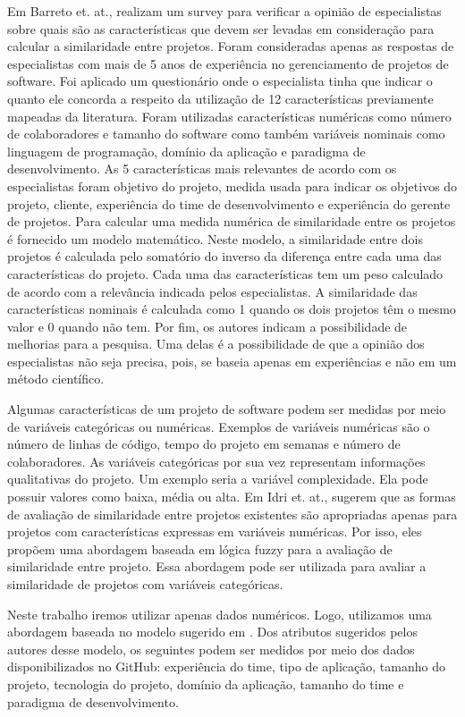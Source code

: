 Em \cite{barreto2010analyzing} Barreto et. at., realizam um survey para verificar a opinião de especialistas sobre quais são as características que devem ser levadas em consideração para calcular a similaridade entre projetos.  Foram consideradas apenas as respostas de especialistas com mais de 5 anos de experiência no gerenciamento de projetos de software.  Foi aplicado um questionário onde o especialista tinha que indicar o quanto ele concorda a respeito da utilização de 12 características previamente mapeadas da literatura. Foram utilizadas características numéricas como número de colaboradores e tamanho do software como também variáveis nominais como linguagem de programação, domínio da aplicação e paradigma de desenvolvimento. As 5 características mais relevantes de acordo com os especialistas foram objetivo do projeto, medida usada para indicar os objetivos do projeto, cliente, experiência do time de desenvolvimento e experiência do gerente de projetos. 
Para calcular uma medida numérica de similaridade entre os projetos é fornecido um modelo matemático. Neste modelo, a similaridade entre dois projetos é calculada pelo somatório do inverso da diferença entre cada uma das características do projeto. Cada uma das características tem um peso calculado de acordo com a relevância indicada pelos especialistas. A similaridade das características nominais é calculada como 1 quando os dois projetos têm o mesmo valor e 0 quando não tem.
Por fim, os autores indicam a possibilidade de melhorias para  a pesquisa. Uma delas é a possibilidade de que a opinião dos especialistas não seja precisa, pois, se baseia apenas em experiências e não em um método científico. 

Algumas características de um projeto de software podem ser medidas por meio de variáveis categóricas ou numéricas. Exemplos de variáveis numéricas são o número de linhas de código, tempo do projeto em semanas e número de colaboradores. As variáveis categóricas por sua vez representam informações qualitativas do projeto. Um exemplo seria a variável complexidade. Ela pode possuir valores como baixa, média ou alta. Em \cite{idri2001fuzzy} Idri et. at., sugerem que as formas de avaliação de similaridade entre projetos existentes são apropriadas apenas para projetos com características expressas em variáveis numéricas. Por isso, eles propõem uma abordagem baseada em lógica fuzzy para a avaliação de similaridade entre projeto. Essa abordagem pode ser utilizada para avaliar a similaridade de projetos com variáveis categóricas.

Neste trabalho iremos utilizar apenas dados numéricos. Logo, utilizamos uma abordagem baseada no modelo sugerido em \cite{barreto2010analyzing} . Dos atributos sugeridos pelos autores desse modelo, os seguintes podem ser medidos por meio dos dados disponibilizados no GitHub: experiência do time, tipo de aplicação, tamanho do projeto, tecnologia do projeto, domínio da aplicação, tamanho do time e paradigma de desenvolvimento.


